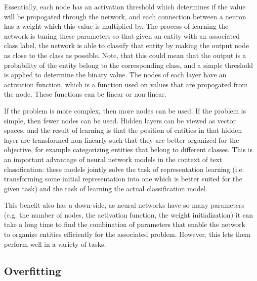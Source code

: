 Essentially, each node has an activation threshold which determines if the value will be propogated through the network, and each connection between a neuron has a weight which this value is multiplied by. The process of learning the network is tuning these parameters so that given an entity with an associated class label, the network is able to classify that entity by making the output node as close to the class as possible. Note, that this could mean that the output is a probability of the entity belong to the corresponding class, and a simple threshold is applied to determine the binary value. The nodes of each layer have an activation function, which is a function used on values that are propogated from the node. These functions can be linear or non-linear.

 If the problem is more complex, then more nodes can be used. If the problem is simple, then fewer nodes can be used. Hidden layers can be viewed as vector spaces, and the result of learning is that the position of entities in that hidden layer are transformed non-linearly such that they are better organized for the objective, for example categorizing entities that belong to different classes. This is an important advantage of neural network models in the context of text classification: these models jointly solve the task of representation learning (i.e. transforming some initial representation into one which is better suited for the given task) and the task of learning the actual classification model.

This benefit also has a down-side, as neural networks have so many parameters (e.g. the number of nodes, the activation function, the weight initialization) it can take a long time to find the combination of parameters that enable the network to organize entities efficiently for the associated problem. However, this lets them perform well in a variety of tasks. 


\subsection{Overfitting} %


